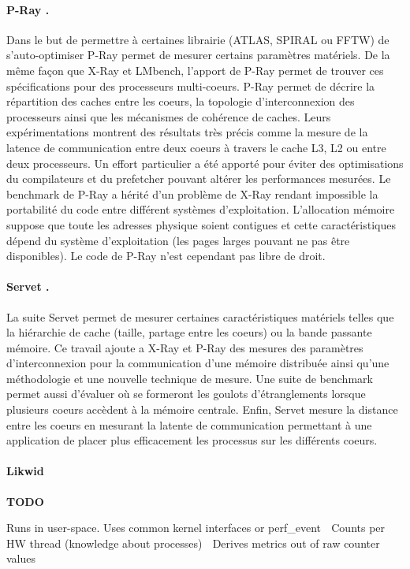 \paragraph{P-Ray \cite{Duchateau2008}.} Dans le but de permettre à certaines librairie (ATLAS, SPIRAL ou FFTW) de s'auto-optimiser P-Ray permet de mesurer certains paramètres matériels. De la même façon que X-Ray et LMbench, l'apport de P-Ray permet de trouver ces spécifications pour des processeurs multi-coeurs. P-Ray permet de décrire la répartition des caches entre les coeurs, la topologie d'interconnexion des processeurs ainsi que les mécanismes de cohérence de caches. Leurs expérimentations montrent des résultats très précis comme la mesure de la latence de communication entre deux coeurs à travers le cache L3, L2 ou entre deux processeurs. Un effort particulier a été apporté pour éviter des optimisations du compilateurs et du prefetcher pouvant altérer les performances mesurées. Le benchmark de P-Ray a hérité d'un problème de X-Ray rendant impossible la portabilité du code entre différent systèmes d'exploitation. L'allocation mémoire suppose que toute les adresses physique soient contigues et cette caractéristiques dépend du système d'exploitation (les pages larges pouvant ne pas être disponibles).
Le code de P-Ray n'est cependant pas libre de droit.

\paragraph{Servet \cite{gonzalez2010servet}.} La suite Servet permet de mesurer certaines caractéristiques matériels telles que la hiérarchie de cache (taille, partage entre les coeurs) ou la bande passante mémoire. Ce travail ajoute a X-Ray et P-Ray des mesures des paramètres d'interconnexion pour la communication d'une mémoire distribuée ainsi qu'une méthodologie et une nouvelle technique de mesure. Une suite de benchmark permet aussi d'évaluer où se formeront les goulots d'étranglements lorsque plusieurs coeurs accèdent à la mémoire centrale. Enfin, Servet mesure la distance entre les coeurs en mesurant la latente de communication permettant à une application de placer plus efficacement les processus sur les différents coeurs.




\paragraph{Likwid}
\textbf{TODO}

Runs in user-space. Uses common kernel interfaces or perf_event
 Counts per HW thread (knowledge about processes)
 Derives metrics out of raw counter values

